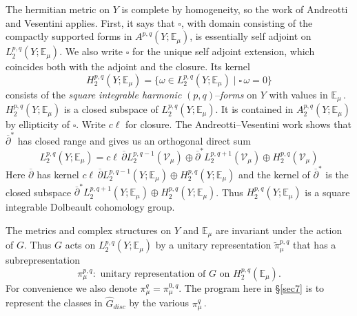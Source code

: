 \documentclass{conm-p-l}
\def\E{\mathbb{E}}
\def\cV{\mathcal{V}}
\begin{document}
The hermitian metric on $Y$ is complete by homogeneity, so the work of
Andreotti and Vesentini \cite{AV1965} applies.  First, it says that 
$\square$, with domain consisting of the compactly supported forms in 
$A^{p,q}(Y;\E_\mu)$,
is essentially self adjoint on $L_2^{p,q}(Y;\E_\mu)$.  We also write
$\square$ for the unique self adjoint extension, which coincides both with
the adjoint and the closure.  Its kernel
\begin{equation}\label{7.1.8}
H_2^{p,q}(Y;\E_\mu) = \{\omega \in L_2^{p,q}(Y;\E_\mu) \mid
	\square\, \omega = 0\}
\end{equation}
consists of the {\em square integrable harmonic}
$(p,q)$--{\em forms} on $Y$ with values in $\E_\mu$\,.
$H_2^{p,q}(Y;\E_\mu)$ is a closed subspace of $L_2^{p,q}(Y;\E_\mu)$.  It is
contained in $A_2^{p,q}(Y;\E_\mu)$  by ellipticity of $\square$.  Write
$c\ell$ for closure.  The Andreotti--Vesentini work shows that
$\overline{\partial}^*$ has closed range and gives us an orthogonal direct sum
\begin{equation}\label{7.1.9}
L_2^{p,q}(Y;\E_\mu) = 
	c\ell\, \overline{\partial} L_2^{p,q-1}(\cV_\mu)
	\oplus \overline{\partial}^* L_2^{p,q+1}(\cV_\mu)
	\oplus H_2^{p,q}(\cV_\mu)
\end{equation}
Here $\overline{\partial}$ has kernel 
$c\ell\,\overline{\partial} L_2^{p,q-1}(Y;\E_\mu)
\oplus H_2^{p,q}(Y;\E_\mu)$  and the kernel of 
$\overline{\partial}^*$ is the closed subspace 
$\overline{\partial}^* L_2^{p,q+1}(Y;\E_\mu)
        \oplus H_2^{p,q}(Y;\E_\mu)$. 
Thus $H_2^{p,q}(Y;\E_\mu)$ is a square integrable Dolbeault cohomology group.

The metrics and complex structures on $Y$ and $\E_\mu$ are invariant under 
the action of $G$.  Thus $G$ acts on $L_2^{p,q}(Y;\E_\mu)$ by a unitary
representation $\widetilde{\pi}_\mu^{p,q}$ that has a subrepresentation
\begin{equation}\label{7.1.10}
\pi_\mu^{p,q}: \text{ unitary representation of $G$ on $H_2^{p,q}(\E_\mu)$.}
\end{equation}
For convenience we also denote $\pi_\mu^q = \pi_\mu^{0,q}$.
The program here in \S \ref{sec7} is to represent the classes in 
$\widehat{G}_{disc}$ by the various $\pi_\mu^q$\,.
\medskip
\end{document}
